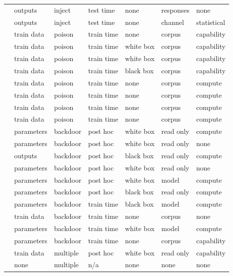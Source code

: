 \begin{landscape}
\begin{longtable}{rllllll}
\cite{DSFHCFKSTT25} & outputs & inject & test time & none & responses & none \\
\cite{ZYWGW25} & outputs & inject & test time & none & channel & statistical \\
\cite{SKL17} & train data & poison & train time & none & corpus & capability \\
\cite{LXSWLGZX25} & train data & poison & train time & white box & corpus & capability \\
\cite{LCMER25} & train data & poison & train time & white box & corpus & capability \\
\cite{MMM19} & train data & poison & train time & black box & corpus & capability \\
\cite{DKKLMS16} & train data & poison & train time & none & corpus & compute \\
\cite{DIKR25} & train data & poison & train time & none & corpus & compute \\
\cite{WZDD24} & train data & poison & train time & none & corpus & compute \\
\cite{BBHS22} & train data & poison & train time & none & corpus & compute \\
\cite{CHLX25} & parameters & backdoor & post hoc & white box & read only & compute \\
\cite{QMZAKFG24} & parameters & backdoor & post hoc & white box & read only & none \\
\cite{NCM25} & outputs & backdoor & post hoc & black box & read only & compute \\
\cite{VG20} & parameters & backdoor & post hoc & white box & read only & none \\
\cite{KKOSVZ24} & parameters & backdoor & post hoc & white box & model & compute \\
\cite{GSVV25} & parameters & backdoor & post hoc & black box & read only & compute \\
\cite{GKVZ22} & parameters & backdoor & train time & black box & model & compute \\
\cite{AKKTARXLNP25} & train data & backdoor & train time & none & corpus & none \\
\cite{DGMRLW24} & parameters & backdoor & train time & white box & model & compute \\
\cite{RT24} & parameters & backdoor & train time & none & corpus & capability \\
\cite{SAHBS26} & train data & multiple & post hoc & white box & read only & capability \\
\cite{KJZXKOS25} & none & multiple & n/a & none & none & none \\

\end{longtable}
\end{landscape}
